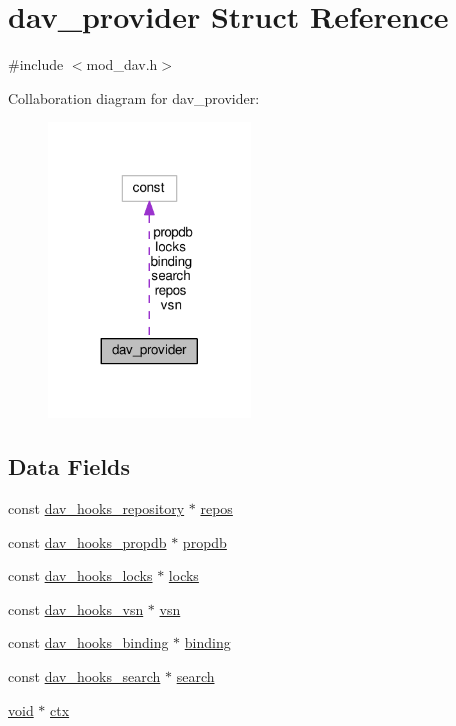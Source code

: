 \hypertarget{structdav__provider}{}\section{dav\+\_\+provider Struct Reference}
\label{structdav__provider}


{\ttfamily \#include $<$mod\+\_\+dav.\+h$>$}



Collaboration diagram for dav\+\_\+provider\+:
\nopagebreak
\begin{figure}[H]
\begin{center}
\leavevmode
\includegraphics[width=152pt]{structdav__provider__coll__graph}
\end{center}
\end{figure}
\subsection*{Data Fields}
\begin{DoxyCompactItemize}
\item 
const \hyperlink{structdav__hooks__repository}{dav\+\_\+hooks\+\_\+repository} $\ast$ \hyperlink{structdav__provider_a61f6962558e1cb7758ea63347815a970}{repos}
\item 
const \hyperlink{structdav__hooks__propdb}{dav\+\_\+hooks\+\_\+propdb} $\ast$ \hyperlink{structdav__provider_a196a69ce923c4c3c6bef68180075cf74}{propdb}
\item 
const \hyperlink{structdav__hooks__locks}{dav\+\_\+hooks\+\_\+locks} $\ast$ \hyperlink{structdav__provider_a25dbf8b437f20c68747156f045ccb9d0}{locks}
\item 
const \hyperlink{structdav__hooks__vsn}{dav\+\_\+hooks\+\_\+vsn} $\ast$ \hyperlink{structdav__provider_a16ffd4af16dbf41759d0d0a69e382da6}{vsn}
\item 
const \hyperlink{structdav__hooks__binding}{dav\+\_\+hooks\+\_\+binding} $\ast$ \hyperlink{structdav__provider_a8349a06cc576a4251c187391724a2217}{binding}
\item 
const \hyperlink{structdav__hooks__search}{dav\+\_\+hooks\+\_\+search} $\ast$ \hyperlink{structdav__provider_a7ffb89a0dd7d7558cb2f130ecd11dc29}{search}
\item 
\hyperlink{group__MOD__ISAPI_gacd6cdbf73df3d9eed42fa493d9b621a6}{void} $\ast$ \hyperlink{structdav__provider_a2f122d40843796bc93ab79eec8435f5d}{ctx}
\end{DoxyCompactItemize}


